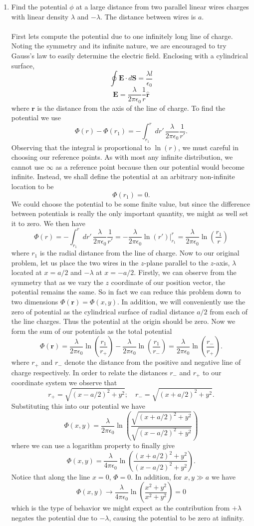 \documentclass[11pt,letterpaper]{article}
\newcommand{\vect}[1]{\mathbf{#1}}
\newcommand{\vecth}[1]{\hat{\mathbf{#1}}}
\newcommand{\epo}{\epsilon_0}
\begin{document}
\begin{enumerate}
\item
Find the potential $\phi$ at a large distance from two parallel linear wires charges with linear density $\lambda$ and $-\lambda$. The distance between wires is $a$. 
\\ \\First lets compute the potential due to one infinitely long line of charge. Noting the symmetry and its infinite nature, we are encouraged to try Gauss's law to easily determine the electric field. Enclosing with a cylindrical surface,
$$\oint{\vect E\cdot d\vect S} = \frac{\lambda l}{\epo}$$
$$\vect E = \frac{\lambda}{2\pi\epo}\frac{1}{r}\vecth r$$
where $\vect r$ is the distance from the axis of the line of charge. To find the potential we use
$$\Phi(r)-\Phi(r_1)= -\int_{r_1}^{r}{dr'\,\frac{\lambda}{2\pi\epo}\frac{1}{r'}}.$$
Observing that the integral is proportional to $\ln(r)$, we must careful in choosing our reference points. As with most any infinite distribution, we cannot use $\infty$ as a reference point because then our potential would become infinite. Instead, we shall define the potential at an arbitrary non-infinite location to be
$$\Phi(r_1) = 0.$$
We could choose the potential to be some finite value, but since the difference between potentials is really the only important quantity, we might as well set it to zero. We then have
$$\Phi(r)= -\int_{r_1}^{r}{dr'\,\frac{\lambda}{2\pi\epo}\frac{1}{r'}} = -\frac{\lambda}{2\pi\epo}\ln(r')|_{r_1}^{r} = \frac{\lambda}{2\pi\epo}\ln\left(\frac{r_1}{r}\right)$$
where $r_1$ is the radial distance from the line of charge. Now to our original problem, let us place the two wires in the $z$-plane parallel to the $z$-axis, $\lambda$ located at $x=a/2$ and $-\lambda$ at $x=-a/2$. Firstly, we can observe from the symmetry that as we vary the $z$ coordinate of our position vector, the potential remains the same. So in fact we can reduce this problem down to two dimensions $\Phi(\vect r) = \Phi(x,y)$. In addition, we will conveniently use the zero of potential as the cylindrical surface of radial distance $a/2$ from each of the line charges. Thus the potential at the origin should be zero. Now we form the sum of our potentials as the total potential
$$\Phi(\vect r) = \frac{\lambda}{2\pi\epo}\ln\left(\frac{r_1}{r_+}\right)-\frac{\lambda}{2\pi\epo}\ln\left(\frac{r_1}{r_-}\right) = \frac{\lambda}{2\pi\epo}\ln\left(\frac{r_-}{r_+}\right).$$
where $r_+$ and $r_-$ denote the distance from the positive and negative line of charge respectively. In order to relate the distances $r_-$ and $r_+$ to our coordinate system we observe that
$$r_+ = \sqrt{(x-a/2)^2+y^2};\quad r_-= \sqrt{(x+a/2)^2+y^2}.$$
Substituting this into our potential we have
$$\Phi(x,y) = \frac{\lambda}{2\pi\epo}\ln\left(\frac{\sqrt{(x+a/2)^2+y^2}}{\sqrt{(x-a/2)^2+y^2}}\right)$$
where we can use a logarithm property to finally give
$$\Phi(x,y) = \frac{\lambda}{4\pi\epo}\ln\left(\frac{(x+a/2)^2+y^2}{(x-a/2)^2+y^2}\right).$$
Notice that along the line $x=0$, $\Phi = 0$. In addition, for $x,y\gg a$ we have
$$\Phi(x,y) \to \frac{\lambda}{4\pi\epo}\ln\left(\frac{x^2+y^2}{x^2+y^2}\right) = 0$$
which is the type of behavior we might expect as the contribution from $+\lambda$ negates the potential due to $-\lambda$, causing the potential to be zero at infinity. 
\end{enumerate}
\end{document}
